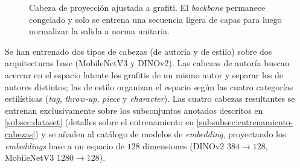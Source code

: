 \begin{figure}[h!]
  \centering
  \shorthandoff{<>}%
  \shorthandon{<>}%
  \caption[Cabeza de proyección ajustada a grafiti]{Cabeza de proyección ajustada a grafiti. El \textit{backbone} permanece
    congelado y solo se entrena una secuencia ligera de capas para luego normalizar
    la salida a norma unitaria.}
  \label{fig:cabeza-proyeccion}
\end{figure}

Se han entrenado dos tipos de cabezas (de autoría y de estilo) sobre dos
arquitecturas base (MobileNetV3 y DINOv2). Las cabezas de autoría buscan
acercar en el espacio latente los grafitis de un mismo autor y separar los de
autores distintos; las de estilo organizan el espacio según las cuatro
categorías estilísticas (\textit{tag}, \textit{throw-up}, \textit{piece} y
\textit{character}). Las cuatro cabezas resultantes se entrenan exclusivamente
sobre los subconjuntos anotados descritos en \ref{subsec:dataset} (detalles
sobre el entrenamiento en  \ref{subsubsec:entrenamiento-cabezas}) y se añaden
al catálogo de modelos de \textit{embedding}, proyectando los
\textit{embeddings} base a un espacio de $128$ dimensiones (DINOv2 $384\to128$,
MobileNetV3 $1280\to128$).

